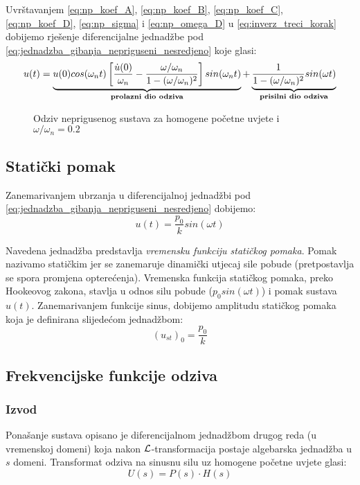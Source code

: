 Uvrštavanjem \eqref{eq:np_koef_A}, \eqref{eq:np_koef_B}, \eqref{eq:np_koef_C},
\eqref{eq:np_koef_D}, \eqref{eq:np_sigma} i \eqref{eq:np_omega_D} u  \eqref{eq:inverz_treci_korak}
dobijemo rješenje diferencijalne jednadžbe pod
\eqref{eq:jednadzba_gibanja_nepriguseni_nesredjeno} 
koje glasi:
\begin{equation}
	u(t)=\underbrace{
            u(0)cos(\omega_n t)
	\left[
		\frac{\dot{u}(0)}{\omega_n}-\frac{\omega/\omega_n}{1-(\omega/\omega_n)^2}
        \right]sin(\omega_n t)\\
	}_{\text{\textbf{prolazni dio odziva}}}
        +
	\underbrace{
		\frac{1}{1-(\omega/\omega_n)^2} sin(\omega t)
	}_{\text{\textbf{prisilni dio odziva}}}
\end{equation}

\begin{figure}[H]
    
    \label{fig:odziv-nepriguseno}
    \caption{Odziv neprigusenog sustava za homogene početne uvjete i
    $\omega/\omega_n=0.2$}
\end{figure}
\newpage

\subsection{Statički pomak}
Zanemarivanjem ubrzanja u diferencijalnoj jednadžbi pod
\eqref{eq:jednadzba_gibanja_nepriguseni_nesredjeno} dobijemo:
\begin{equation}\label{eq:vremenska_funkcija_statickog_pomaka}
	u(t)=\frac{p_0}{k}sin(\omega t)
\end{equation}

Navedena jednadžba predstavlja \textit{vremensku funkciju statičkog pomaka}. Pomak
nazivamo statičkim jer se zanemaruje dinamički utjecaj sile pobude (pretpostavlja se
spora promjena opterećenja).
Vremenska funkcija statičkog pomaka, preko Hookeovog zakona, stavlja u odnos silu 
pobude ($p_0sin(\omega t)$) i pomak sustava $u(t)$. Zanemarivanjem funkcije sinus, dobijemo
amplitudu statičkog pomaka koja je definirana slijedećom jednadžbom:
\begin{equation}
	(u_{st})_0 = \frac{p_0}{k}
\end{equation}

\subsection{Frekvencijske funkcije odziva}
\subsubsection{Izvod}
Ponašanje sustava opisano je diferencijalnom jednadžbom drugog reda (u vremenskoj
domeni) koja nakon $\mathcal{L}$-transformacija postaje algebarska jednadžba u $s$ domeni.
Transformat odziva na sinusnu silu uz homogene početne uvjete glasi:
\begin{equation}
    U(s) = P(s)\cdot H(s) 
\end{equation}

